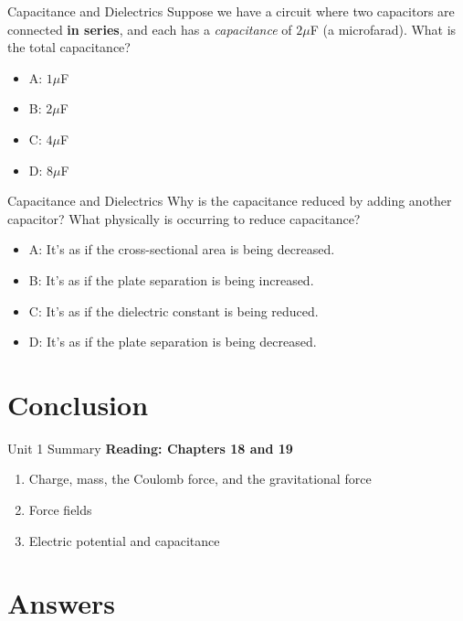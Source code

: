 \documentclass{beamer}
\begin{document}
\begin{frame}{Capacitance and Dielectrics}
Suppose we have a circuit where two capacitors are connected \textbf{in series}, and each has a \textit{capacitance} of $2\mu$F (a microfarad).  What is the total capacitance?
\begin{itemize}
\item A: $1\mu$F
\item B: $2\mu$F
\item C: $4\mu$F
\item D: $8\mu$F
\end{itemize}
\end{frame}

\begin{frame}{Capacitance and Dielectrics}
Why is the capacitance reduced by adding another capacitor?  What physically is occurring to reduce capacitance?
\begin{itemize}
\item A: It's as if the cross-sectional area is being decreased.
\item B: It's as if the plate separation is being increased.
\item C: It's as if the dielectric constant is being reduced.
\item D: It's as if the plate separation is being decreased.
\end{itemize}
\end{frame}

\section{Conclusion}

\begin{frame}{Unit 1 Summary}
\textbf{Reading: Chapters 18 and 19}
\begin{enumerate}
\item Charge, mass, the Coulomb force, and the gravitational force
\item Force fields
\item Electric potential and capacitance
\end{enumerate}
\end{frame}

\section{Answers}
\end{document}
